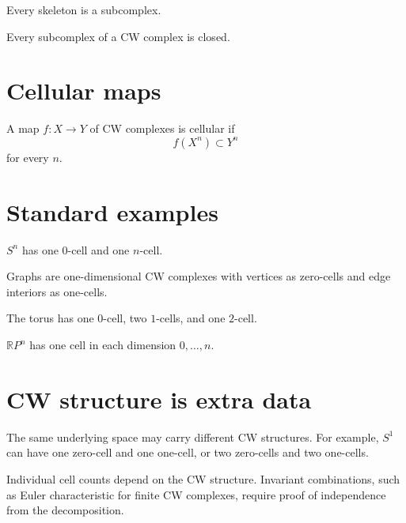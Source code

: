 Every skeleton is a subcomplex.

\begin{proposition}\label{prop:viii06-subcomplex-closed}
Every subcomplex of a CW complex is closed.
\end{proposition}

\section{Cellular maps}
\begin{definition}\label{def:viii06-cellular}
A map \(f:X\to Y\) of CW complexes is cellular if
\[
f(X^n)\subset Y^n
\]
for every \(n\).
\end{definition}

\section{Standard examples}
\begin{example}[Sphere]\label{ex:viii06-sphere}
\(S^n\) has one \(0\)-cell and one \(n\)-cell.
\end{example}

\begin{example}[Graph]\label{ex:viii06-graph}
Graphs are one-dimensional CW complexes with vertices as zero-cells and edge
interiors as one-cells.
\end{example}

\begin{example}[Torus]\label{ex:viii06-torus}
The torus has one \(0\)-cell, two \(1\)-cells, and one \(2\)-cell.
\end{example}

\begin{example}\label{ex:viii06-projective}
\(\mathbb RP^n\) has one cell in each dimension \(0,\dots,n\).
\end{example}

\section{CW structure is extra data}
The same underlying space may carry different CW structures.  For example,
\(S^1\) can have one zero-cell and one one-cell, or two zero-cells and two
one-cells.

\begin{warning}\label{warn:viii06-cell-counts}
Individual cell counts depend on the CW structure.  Invariant combinations,
such as Euler characteristic for finite CW complexes, require proof of
independence from the decomposition.
\end{warning}

